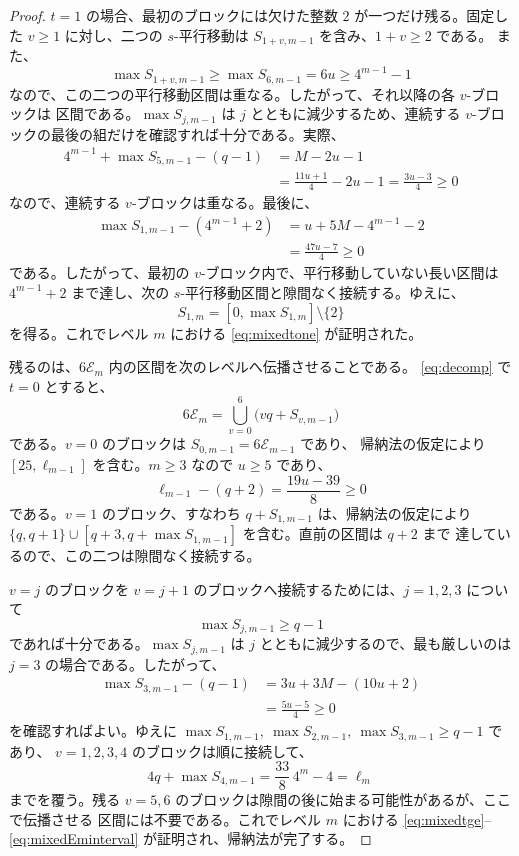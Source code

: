 \documentclass[12pt]{ltjsarticle}
\theoremstyle{plain}
\begin{document}
\begin{proof}
$t=1$ の場合、最初のブロックには欠けた整数 $2$ が一つだけ残る。固定した
$v\geq1$ に対し、二つの $s$-平行移動は $S_{1+v,m-1}$ を含み、$1+v\geq2$ である。
また、
\[
 \max S_{1+v,m-1}\geq\max S_{6,m-1}=6u\geq4^{m-1}-1
\]
なので、この二つの平行移動区間は重なる。したがって、それ以降の各 $v$-ブロックは
区間である。$\max S_{j,m-1}$ は $j$ とともに減少するため、連続する
$v$-ブロックの最後の組だけを確認すれば十分である。実際、
\[
\begin{aligned}
 4^{m-1}+\max S_{5,m-1}-(q-1)
 &=M-2u-1\\
 &=\frac{11u+1}{4}-2u-1
  =\frac{3u-3}{4}\geq0
\end{aligned}
\]
なので、連続する $v$-ブロックは重なる。最後に、
\[
\begin{aligned}
 \max S_{1,m-1}-(4^{m-1}+2)
 &=u+5M-4^{m-1}-2\\
 &=\frac{47u-7}{4}\geq0
\end{aligned}
\]
である。したがって、最初の $v$-ブロック内で、平行移動していない長い区間は
$4^{m-1}+2$ まで達し、次の $s$-平行移動区間と隙間なく接続する。ゆえに、
\[
 S_{1,m}=[0,\max S_{1,m}]\setminus\{2\}
\]
を得る。これでレベル $m$ における \eqref{eq:mixedtone} が証明された。

残るのは、$6\mathcal E_m$ 内の区間を次のレベルへ伝播させることである。
\eqref{eq:decomp} で $t=0$ とすると、
\[
 6\mathcal E_m=\bigcup_{v=0}^{6}\bigl(vq+S_{v,m-1}\bigr)
\]
である。$v=0$ のブロックは $S_{0,m-1}=6\mathcal E_{m-1}$ であり、
帰納法の仮定により $[25,\ell_{m-1}]$ を含む。$m\geq3$ なので $u\geq5$ であり、
\[
 \ell_{m-1}-(q+2)=\frac{19u-39}{8}\geq0
\]
である。$v=1$ のブロック、すなわち $q+S_{1,m-1}$ は、帰納法の仮定により
$\{q,q+1\}\cup[q+3,q+\max S_{1,m-1}]$ を含む。直前の区間は $q+2$ まで
達しているので、この二つは隙間なく接続する。

$v=j$ のブロックを $v=j+1$ のブロックへ接続するためには、$j=1,2,3$ について
\[
 \max S_{j,m-1}\geq q-1
\]
であれば十分である。$\max S_{j,m-1}$ は $j$ とともに減少するので、最も厳しいのは
$j=3$ の場合である。したがって、
\[
\begin{aligned}
 \max S_{3,m-1}-(q-1)
 &=3u+3M-(10u+2)\\
 &=\frac{5u-5}{4}\geq0
\end{aligned}
\]
を確認すればよい。ゆえに
$\max S_{1,m-1},\ \max S_{2,m-1},\ \max S_{3,m-1}\geq q-1$ であり、
$v=1,2,3,4$ のブロックは順に接続して、
\[
 4q+\max S_{4,m-1}=\frac{33}{8}\,4^m-4=\ell_m
\]
までを覆う。残る $v=5,6$ のブロックは隙間の後に始まる可能性があるが、ここで伝播させる
区間には不要である。これでレベル $m$ における
\eqref{eq:mixedtge}--\eqref{eq:mixedEminterval} が証明され、帰納法が完了する。
\end{proof}
\end{document}
